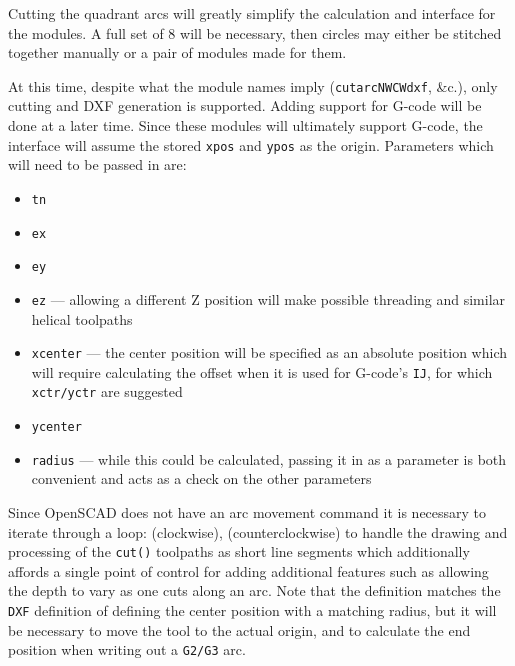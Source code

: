 \documentclass{ltxdoc}
\begin{document}
Cutting the quadrant arcs will greatly simplify the calculation and interface for the modules. A full set of 8 will be necessary, then circles may either be stitched together manually or a pair of modules made for them.
 
At this time, despite what the module names imply (\texttt{cutarcNWCWdxf}, \&c.), only cutting and DXF generation is supported. Adding support for G-code will be done at a later time. Since these modules will ultimately support G-code, the interface will assume the stored \texttt{xpos} and \texttt{ypos} as the origin. Parameters which will need to be passed in are:
 
\begin{itemize}
 \item \texttt{tn}
 \item \texttt{ex}
 \item \texttt{ey}
 \item \texttt{ez} --- allowing a different Z position will make possible threading and
                       similar helical toolpaths
\item \texttt{xcenter} --- the center position will be specified as an absolute position
      which will require calculating the offset when it is used for G-code's \texttt{IJ},
      for which \texttt{xctr/yctr} are suggested 
\item \texttt{ycenter}
\item \texttt{radius} --- while this could be calculated, passing it in as a parameter
      is both convenient and acts as a check on the other parameters
\end{itemize}

Since OpenSCAD does not have an arc movement command it is necessary to iterate through a loop:  (clockwise),  (counterclockwise) to handle the drawing and processing of the \texttt{cut()} toolpaths as short line segments which additionally affords a single point of control for adding additional features such as allowing the depth to  vary as one cuts along an arc. Note that the definition matches the \verb|DXF| definition of defining the center position with a matching radius, but it will be necessary to move the tool to the actual origin, and to calculate the end position when writing out a \verb|G2/G3| arc.
\end{document}
